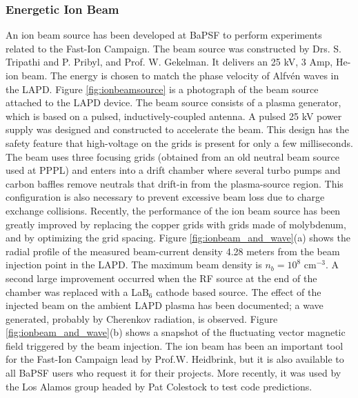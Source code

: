 \documentclass[11pt]{article}
\begin{document}
\subsubsection{Energetic Ion Beam}
An ion beam source has been developed at BaPSF to perform experiments related to the Fast-Ion Campaign.  The beam source was constructed by Drs. S. Tripathi and P. Pribyl, and Prof. W. Gekelman.  It delivers an 25 kV, 3 Amp, He-ion beam.  The energy is chosen to match the phase velocity of Alfv\'{e}n waves in the LAPD.  Figure \ref{fig:ionbeamsource} is a photograph of the beam source attached to the LAPD device.  The beam source consists of a plasma generator, which is based on a pulsed, inductively-coupled antenna.  A pulsed 25 kV power supply was designed and constructed to accelerate the beam.  This design has the safety feature that high-voltage on the grids is present for only a few milliseconds. 
 The beam uses three focusing grids (obtained from an old neutral beam source used at PPPL) and enters into a drift chamber where several turbo pumps and carbon baffles remove neutrals that drift-in from the plasma-source region.  This configuration is also necessary to prevent excessive beam loss due to charge exchange collisions.
	Recently, the performance of the ion beam source has been greatly improved by replacing the copper grids with grids made of molybdenum, and by optimizing the grid spacing.  Figure \ref{fig:ionbeam_and_wave}(a) shows the radial profile of the measured beam-current density 4.28 meters from the beam injection point in the LAPD.  The maximum beam density is $n_{b} = 10^{8}$ cm$^{-3}$. A second large  improvement occurred when the RF source at the end of the chamber was replaced with a LaB$_{6}$ cathode based source.
The effect of the injected beam on the ambient LAPD plasma has been documented; a wave generated, probably by Cherenkov radiation, is observed. Figure \ref{fig:ionbeam_and_wave}(b) shows a snapshot of the fluctuating vector magnetic field triggered by the beam injection.  The ion beam has been an important tool for the Fast-Ion Campaign lead by Prof.W. Heidbrink, but it is also available to all BaPSF users who request it for their projects.   More recently, it was used by the Los Alamos group headed by Pat Colestock to test code predictions.
\end{document}
